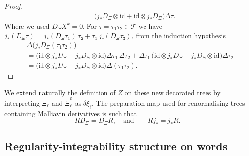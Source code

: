 \documentclass[11pt]{preprint}
\def\id{\mathrm{id}}
\newcommand{\mcT}{\mathcal{T}}
\begin{document}
\begin{proof}
\begin{align*}
		&= \big(j_*D_\Xi\otimes\id + \id\otimes j_*D_\Xi   \big)\Delta\tau.
	\end{align*}
	Where we used $D_\Xi X^k=0$.
	For $\tau=\tau_1\tau_2\in\mcT$ we have $j_*(D_\Xi\tau)=j_*(D_\Xi \tau_1)\,\tau_2+\tau_1\,j_*(D_\Xi \tau_2) $, from the induction hypothesis
	\begin{align*}
		& \Delta\big(j_* D_\Xi(\tau_1\tau_2)\big) 
		\\
		&=  \big(\id\otimes j_*D_\Xi+j_*D_\Xi\otimes \id\big)\Delta\tau_1\, \Delta \tau_2  + \Delta\tau_1\, \big(\id\otimes j_*D_\Xi+j_*D_\Xi\otimes \id\big)\Delta\tau_2
		\\
		&= \big(\id\otimes j_*D_\Xi+j_*D_\Xi\otimes \id\big)\Delta(\tau_1\tau_2).
	\end{align*}
\end{proof}
We extend naturally the definition of $Z$ on these new decorated trees by interpreting $\dot{\Xi}_\ell$ and $\dot{\Xi}_\ell^0$ as $ \delta \xi_\ell$. The preparation map used for renormalising trees containing Malliavin derivatives is such that
\begin{equation}
	\label{commutation_R}
	R D_{\Xi} = D_{\Xi} R, \quad \text{and}\qquad Rj_*=j_*R.
\end{equation}


\subsection{Regularity-integrability structure on words}
\end{document}
